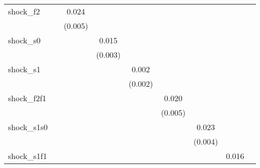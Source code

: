 {\begin{tabular}{l*{8}{c}}
\addlinespace
shock\_f2    &                     &       0.024\sym{***}&                     &                     &                     &                     &                     &                     \\
            &                     &     (0.005)         &                     &                     &                     &                     &                     &                     \\
\addlinespace
shock\_s0    &                     &                     &       0.015\sym{***}&                     &                     &                     &                     &                     \\
            &                     &                     &     (0.003)         &                     &                     &                     &                     &                     \\
\addlinespace
shock\_s1    &                     &                     &                     &       0.002         &                     &                     &                     &                     \\
            &                     &                     &                     &     (0.002)         &                     &                     &                     &                     \\
\addlinespace
shock\_f2f1  &                     &                     &                     &                     &       0.020\sym{***}&                     &                     &                     \\
            &                     &                     &                     &                     &     (0.005)         &                     &                     &                     \\
\addlinespace
shock\_s1s0  &                     &                     &                     &                     &                     &       0.023\sym{***}&                     &                     \\
            &                     &                     &                     &                     &                     &     (0.004)         &                     &                     \\
\addlinespace
shock\_s1f1  &                     &                     &                     &                     &                     &                     &       0.016\sym{***}&                     \\

\end{tabular}}
